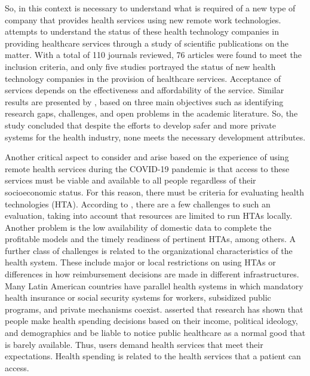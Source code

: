 \documentclass[sustainability,article,submit,pdftex,moreauthors]{Definitions/mdpi}
\begin{document}
So, in this context is necessary to understand what is required of a new type of company that provides health services using new remote work technologies. \citet{chakraborty2021health} attempts to understand the status of these health technology companies in providing healthcare services through a study of scientific publications on the matter. With a total of 110 journals reviewed, 76 articles were found to meet the inclusion criteria, and only five studies portrayed the status of new health technology companies in the provision of healthcare services. Acceptance of services depends on the effectiveness and affordability of the service. Similar results are presented by \citet{qahtan2022review}, based on three main objectives such as identifying research gaps, challenges, and open problems in the academic literature. So, the study concluded that despite the efforts to develop safer and more private systems for the health industry, none meets the necessary development attributes.

Another critical aspect to consider and arise based on the experience of using remote health services during the COVID-19 pandemic is that access to these services must be viable and available to all people regardless of their socioeconomic status. For this reason, there must be criteria for evaluating health technologies (HTA). According to \citet{drummond2022challenges}, there are a few challenges to such an evaluation, taking into account that resources are limited to run HTAs locally. Another problem is the low availability of domestic data to complete the profitable models and the timely readiness of pertinent HTAs, among others. A further class of challenges is related to the organizational characteristics of the health system. These include major or local restrictions on using HTAs or differences in how reimbursement decisions are made in different infrastructures. Many Latin American countries have parallel health systems in which mandatory health insurance or social security systems for workers, subsidized public programs, and private mechanisms coexist. \citet{meleddu2020public} asserted that research has shown that people make health spending decisions based on their income, political ideology, and demographics and be liable to notice public healthcare as a normal good that is barely available. Thus, users demand health services that meet their expectations. Health spending is related to the health services that a patient can access.
\end{document}
